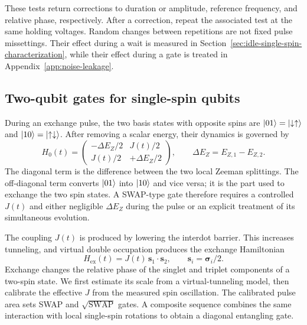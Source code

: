 These tests return corrections to duration or amplitude, reference
frequency, and relative phase, respectively. After a correction,
repeat the associated test at the same holding voltages. Random
changes between repetitions are not fixed pulse missettings. Their
effect during a wait is measured in
Section~\ref{sec:idle-single-spin-characterization}, while their
effect during a gate is treated in
Appendix~\ref{app:noise-leakage}.

\subsection{Two-qubit gates for single-spin qubits}
\label{sec:measurement-exchange-oscillations}

During an exchange pulse, the two basis states with opposite spins
are $\lvert 01\rangle=\lvert \downarrow\uparrow\rangle$ and
$\lvert 10\rangle=\lvert \uparrow\downarrow\rangle$. After removing a scalar energy,
their dynamics is governed by
\begin{equation}
 H_{0}(t)=
 \begin{pmatrix}
  -\Delta E_Z/2 & J(t)/2\\
  J(t)/2 & +\Delta E_Z/2
 \end{pmatrix},
 \qquad \Delta E_Z=E_{Z,1}-E_{Z,2}.
 \label{eq:calibration-two-spin-subspace-hamiltonian}
\end{equation}
The diagonal term is the difference between the two local Zeeman
splittings. The off-diagonal term converts $\lvert 01\rangle$ into
$\lvert 10\rangle$ and vice versa; it is the part used to exchange the two
spin states. A SWAP-type gate therefore requires a controlled
$J(t)$ and either negligible $\Delta E_Z$ during the pulse or an
explicit treatment of its simultaneous evolution.

The coupling $J(t)$ is produced by lowering the interdot barrier.
This increases tunneling, and virtual double occupation produces
the exchange Hamiltonian
\begin{equation}
 H_{\mathrm{ex}}(t)=J(t)\,\mathbf s_1\cdot\mathbf s_2,
 \qquad \mathbf s_i=\boldsymbol{\sigma}_i/2.
 \label{eq:measurement-exchange-hamiltonian}
\end{equation}
Exchange changes the relative phase of the singlet and triplet
components of a two-spin state. We first estimate its scale from a
virtual-tunneling model, then calibrate the effective $J$ from the
measured spin oscillation. The calibrated pulse area sets SWAP and
$\sqrt{\mathrm{SWAP}}$ gates. A composite sequence combines the same
interaction with local single-spin rotations to obtain a diagonal
entangling gate.

